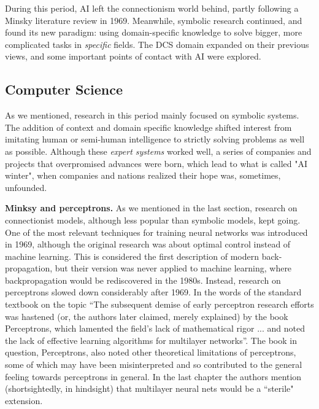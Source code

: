 \documentclass[../main.tex]{subfiles}
\begin{document}
During this period, AI left the connectionism world behind, partly following a Minsky literature review in 1969. Meanwhile, symbolic research continued, and found its new paradigm: using domain-specific knowledge to solve bigger, more complicated tasks in \textit{specific} fields. The DCS domain expanded on their previous views, and some important points of contact with AI were explored.

\subsection{Computer Science}
As we mentioned, research in this period mainly focused on symbolic systems. The addition of context and domain specific knowledge shifted interest from imitating human or semi-human intelligence to strictly solving problems as well as possible. Although these \textit{expert systems} worked well, a series of companies and projects that overpromised advances were born, which lead to what is called "AI winter", when companies and nations realized their hope was, sometimes, unfounded.

\vspace{4pt}
\textbf{Minksy and perceptrons.}
As we mentioned in the last section, research on connectionist models, although less popular than symbolic models, kept going. One of the most relevant techniques for training neural networks was introduced in 1969\cite{brysonAppliedOptimalControl1969}, although the original research was about optimal control instead of machine learning. This is considered the first description of modern back-propagation\cite{lecunTheoreticalFrameworkBackpropagation1988}, but their version was never applied to machine learning, where backpropagation would be rediscovered in the 1980s.
Instead, research on perceptrons slowed down considerably after 1969. In the words of the standard textbook on the topic \enquote{The subsequent demise of early perceptron research efforts was hastened (or, the authors later claimed, merely explained) by the book Perceptrons, which lamented the field's lack of mathematical rigor ... and noted the lack of effective learning algorithms for multilayer networks}. The book in question, Perceptrons\cite{minskyPerceptronIntroductionComputational1969}, also noted other theoretical limitations of perceptrons, some of which may have been misinterpreted and so contributed to the general feeling towards perceptrons in general. In the last chapter the authors mention (shortsightedly, in hindsight) that multilayer neural nets would be a ``sterile" extension.
\end{document}
